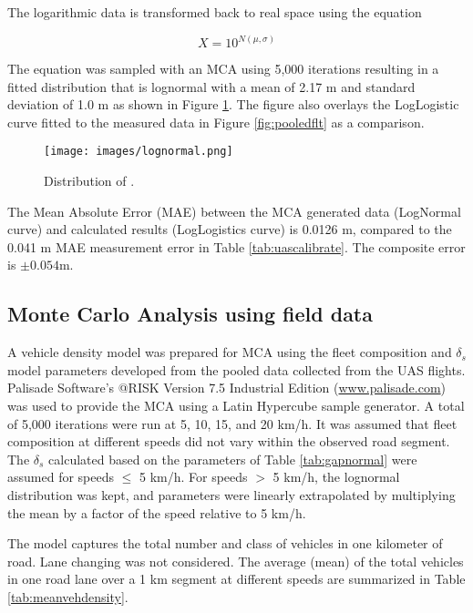 \documentclass[preprint,12pt,a4paper]{elsarticle}
\begin{document}
\begin{linenumbers}
The logarithmic data is transformed back to real space using the equation

\begin{equation}
\label{inverse-10}
X = 10^{N(\mu,\sigma)}
\end{equation}

The equation was sampled with an MCA using 5,000 iterations resulting in a fitted distribution that is lognormal with a mean of 2.17 m and standard deviation of 1.0 m as shown in Figure \ref{fig:lognormal}.  The figure also overlays the LogLogistic curve fitted to the measured data in Figure \ref{fig:pooledflt} as a comparison.
 
\begin{figure}[H]
\centering
\texttt{[image: images/lognormal.png]} 
\caption{Distribution of .}
\label{fig:lognormal}
\end{figure}

The Mean Absolute Error (MAE) between the MCA generated data (LogNormal curve) and calculated results (LogLogistics curve) is 0.0126 m, compared to the 0.041 m MAE measurement error in Table \ref{tab:uascalibrate}. The composite error is $\pm 0.054$m.


\subsection{Monte Carlo Analysis using field data}
A vehicle density model was prepared for MCA using the fleet composition and $\delta_{s}$ model parameters developed from the pooled data collected from the UAS flights. Palisade Software’s @RISK Version 7.5 Industrial Edition (\url{www.palisade.com}) was used to provide the MCA using a Latin Hypercube sample generator.  A total of 5,000 iterations were run at 5, 10, 15, and 20 km/h. It was assumed that fleet composition at different speeds did not vary within the observed road segment. The $\delta_{s}$ calculated based on the parameters of Table \ref{tab:gapnormal} were assumed for speeds $\leq$ 5 km/h. For speeds $>$ 5 km/h, the lognormal distribution was kept, and parameters were linearly extrapolated by multiplying the mean by a factor of the speed relative to 5 km/h.  

The model captures the total number and class of vehicles in one kilometer of road.  Lane changing was not considered. The average (mean) of the total vehicles in one road lane over a 1 km segment at different speeds are summarized in Table \ref{tab:meanvehdensity}.


\end{linenumbers}
\end{document}
